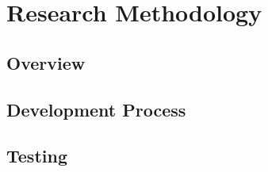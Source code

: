 \section{Research Methodology}

\subsection{Overview}

\subsection{Development Process}

\subsection{Testing}




